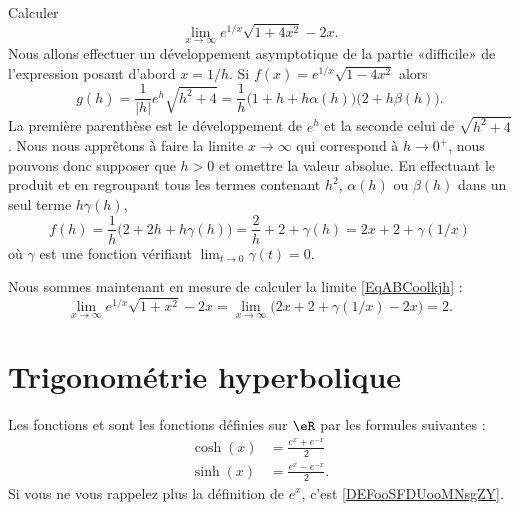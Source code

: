 \begin{example}	\label{ExBCDookjljhjk}
	Calculer
	\begin{equation}\label{EqABCoolkjh}
		\lim_{x\to \infty}  e^{1/x}\sqrt{1+4x^2}-2x.
	\end{equation}
	Nous allons effectuer un développement asymptotique de la partie «difficile» de l'expression posant d'abord \( x=1/h\). Si \( f(x)=e^{1/x}\sqrt{1-4x^2}\) alors
	\begin{equation}
		g(h)=\frac{1}{|h|}e^h\sqrt{h^2+4}=\frac{1}{h}\big(  1+h+h\alpha(h) \big)\big( 2+h\beta(h) \big).
	\end{equation}
	La première parenthèse est le développement de \( e^h\) et la seconde celui de \( \sqrt{h^2+4}\). Nous nous apprêtons à faire la limite \( x\to\infty\) qui correspond à \( h\to 0^+\), nous pouvons donc supposer que \( h>0\) et omettre la valeur absolue. En effectuant le produit et en regroupant tous les termes contenant \( h^2\), \( \alpha(h)\) ou \( \beta(h)\) dans un seul terme \( h\gamma(h)\),
	\begin{equation}
		f(h)=\frac{1}{h}\big(  2+2h+h\gamma(h) \big)=\frac{2}{h}+2+\gamma(h)=2x+2+\gamma(1/x)
	\end{equation}
	où \( \gamma\) est une fonction vérifiant \( \lim_{t\to 0}\gamma(t)=0\).

	Nous sommes maintenant en mesure de calculer la limite \eqref{EqABCoolkjh} :
	\begin{equation}
		\lim_{x\to\infty}e^{1/x}\sqrt{1+x^2}-2x= \lim_{x\to \infty}\big(  2x+2+\gamma(1/x)-2x \big)=2.
	\end{equation}
\end{example}

\section{Trigonométrie hyperbolique}

\begin{definition}
	Les fonctions  et  sont les fonctions définies sur \( \eR\) par les formules suivantes :
	\begin{subequations}
		\begin{align}
			\cosh(x) & =\frac{  e^{x}+ e^{-x} }{2}  \\
			\sinh(x) & =\frac{  e^{x}- e^{-x} }{2}.
		\end{align}
	\end{subequations}
	Si vous ne vous rappelez plus la définition de \( e^x\), c'est \ref{DEFooSFDUooMNsgZY}.
\end{definition}

